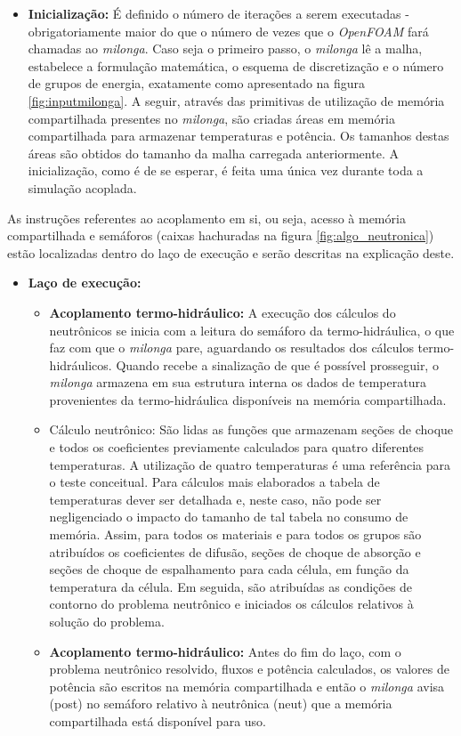 \begin{itemize}
\item \textbf{Inicialização:} É definido o número de iterações a serem executadas - obrigatoriamente maior do que o número
  de vezes que o \textit{OpenFOAM} fará chamadas ao \textit{milonga}. Caso seja o primeiro passo, o \textit{milonga}
  lê a malha, estabelece a formulação matemática, o esquema de discretização e o número de grupos de energia, exatamente
  como apresentado na figura \ref{fig:inputmilonga}. A seguir, através das primitivas de utilização de memória compartilhada
  presentes no \textit{milonga}, são criadas áreas em memória compartilhada para armazenar temperaturas e potência. Os tamanhos
  destas áreas são obtidos do tamanho da malha carregada anteriormente. A inicialização, como é de se esperar, é feita uma única
  vez durante toda a simulação acoplada.
\end{itemize}

As instruções referentes ao acoplamento em si, ou seja, acesso à memória compartilhada e semáforos
(caixas hachuradas na figura \ref{fig:algo_neutronica}) estão localizadas dentro do laço de execução e serão
descritas na explicação deste.

\begin{itemize}
\item \textbf{Laço de execução:}

\begin{itemize}
\item \textbf{Acoplamento termo-hidráulico:} A execução dos cálculos do neutrônicos se inicia com a leitura do semáforo da
  termo-hidráulica, o que faz com que o \textit{milonga} pare, aguardando os resultados dos cálculos termo-hidráulicos.
  Quando recebe a sinalização de que é possível prosseguir, o \textit{milonga} armazena em sua estrutura interna os dados
  de temperatura provenientes da termo-hidráulica disponíveis na memória compartilhada.
\item Cálculo neutrônico: São lidas as funções que armazenam seções de choque e todos os coeficientes previamente calculados para quatro
  diferentes temperaturas. A utilização de quatro temperaturas é uma referência para o teste conceitual. Para cálculos mais elaborados
  a tabela de temperaturas dever ser detalhada e, neste caso, não pode ser negligenciado o impacto do tamanho de tal tabela
  no consumo de memória.
  Assim, para todos os materiais e para todos os grupos são atribuídos os coeficientes de difusão,
  seções de choque de absorção e seções de choque de espalhamento para cada célula, em função da temperatura da célula.
  Em seguida, são atribuídas as condições de contorno do problema neutrônico e iniciados os cálculos relativos à solução do problema.
\item \textbf{Acoplamento termo-hidráulico:} Antes do fim do laço, com o problema neutrônico resolvido, fluxos e potência
  calculados, os valores de potência são escritos na memória compartilhada e então o \textit{milonga} avisa (post) no
  semáforo relativo à neutrônica (neut) que a memória compartilhada está disponível para uso.

\end{itemize}
\end{itemize}

